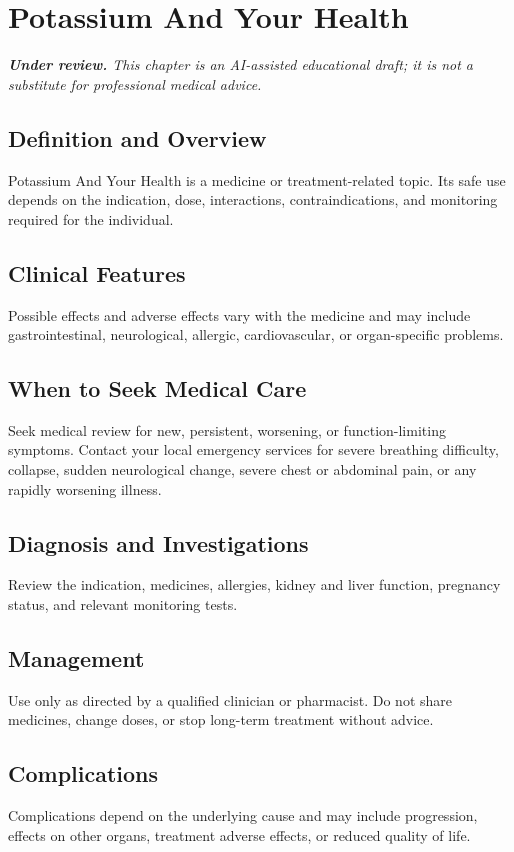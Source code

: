 \chapter{Potassium And Your Health}

\medskip
\noindent\textit{\textbf{Under review.} This chapter is an AI-assisted educational draft; it is not a substitute for professional medical advice.}

\section*{Definition and Overview}
Potassium And Your Health is a medicine or treatment-related topic. Its safe use depends on the indication, dose, interactions, contraindications, and monitoring required for the individual.

\section*{Clinical Features}
Possible effects and adverse effects vary with the medicine and may include gastrointestinal, neurological, allergic, cardiovascular, or organ-specific problems.

\section*{When to Seek Medical Care}
Seek medical review for new, persistent, worsening, or function-limiting symptoms. Contact your local emergency services for severe breathing difficulty, collapse, sudden neurological change, severe chest or abdominal pain, or any rapidly worsening illness.

\section*{Diagnosis and Investigations}
Review the indication, medicines, allergies, kidney and liver function, pregnancy status, and relevant monitoring tests.

\section*{Management}
Use only as directed by a qualified clinician or pharmacist. Do not share medicines, change doses, or stop long-term treatment without advice.

\section*{Complications}
Complications depend on the underlying cause and may include progression, effects on other organs, treatment adverse effects, or reduced quality of life.

